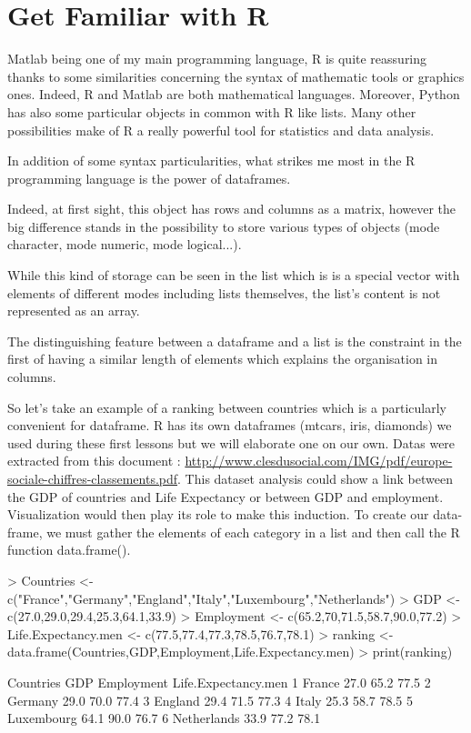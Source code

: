 \documentclass{article}
\begin{document}
\section{Get Familiar with R}

  Matlab being one of my main programming language, R is quite reassuring thanks to some similarities concerning the syntax of mathematic tools or graphics ones. Indeed, R and Matlab are both mathematical languages. Moreover, Python has also some particular objects in common with R like lists. Many other possibilities make of R a really powerful tool for statistics and data analysis.

In addition of some syntax particularities, what strikes me most in the R programming language is the power of dataframes. 
 
Indeed, at first sight, this object has rows and columns as a matrix, however the big difference stands in the possibility to store various types of objects (mode character, mode numeric, mode logical...).
 
While this kind of storage can be seen in the list which is is a special vector with elements of different modes including lists themselves, the list's content is not represented as an array. 
 
The distinguishing feature between a dataframe and a list is the constraint in the first of having a similar length of elements which explains the organisation in columns. 

So let's take an example of a ranking between countries which is a particularly convenient for dataframe. R has its own dataframes (mtcars, iris, diamonds) we used during these first lessons but we will elaborate one on our own. Datas were extracted from this document : \url{http://www.clesdusocial.com/IMG/pdf/europe-sociale-chiffres-classements.pdf}. This dataset analysis could show a link between the GDP of countries and Life Expectancy or between GDP and employment. Visualization would then play its role to make this induction.
To create our data-frame, we must gather the elements of each category in a list and then call the R function data.frame().

\begin{Schunk}
\begin{Sinput}
> Countries <- c("France","Germany","England","Italy","Luxembourg","Netherlands")
> GDP <- c(27.0,29.0,29.4,25.3,64.1,33.9)
> Employment <- c(65.2,70,71.5,58.7,90.0,77.2)
> Life.Expectancy.men <- c(77.5,77.4,77.3,78.5,76.7,78.1)
> ranking <- data.frame(Countries,GDP,Employment,Life.Expectancy.men)
> print(ranking)
\end{Sinput}
\begin{Soutput}
    Countries  GDP Employment Life.Expectancy.men
1      France 27.0       65.2                77.5
2     Germany 29.0       70.0                77.4
3     England 29.4       71.5                77.3
4       Italy 25.3       58.7                78.5
5  Luxembourg 64.1       90.0                76.7
6 Netherlands 33.9       77.2                78.1
\end{Soutput}
\end{Schunk}
\end{document}
